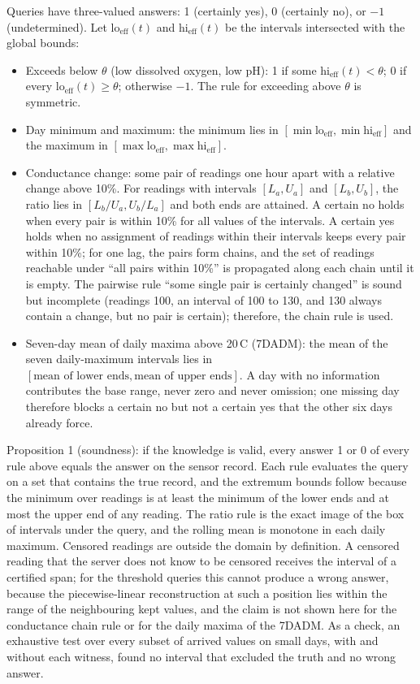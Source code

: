 Queries have three-valued answers: 1 (certainly yes), 0 (certainly no), or $-1$ (undetermined). Let lo$_\mathrm{eff}(t)$ and hi$_\mathrm{eff}(t)$ be the intervals intersected with the global bounds:
\begin{itemize}
  \item Exceeds below $\theta$ (low dissolved oxygen, low pH): 1 if some hi$_\mathrm{eff}(t) < \theta$; 0 if every lo$_\mathrm{eff}(t) \ge \theta$; otherwise $-1$. The rule for exceeding above $\theta$ is symmetric.
  \item Day minimum and maximum: the minimum lies in $[\min \mathrm{lo}_\mathrm{eff}, \min \mathrm{hi}_\mathrm{eff}]$ and the maximum in $[\max \mathrm{lo}_\mathrm{eff}, \max \mathrm{hi}_\mathrm{eff}]$.
  \item Conductance change: some pair of readings one hour apart with a relative change above 10\%. For readings with intervals $[L_a, U_a]$ and $[L_b, U_b]$, the ratio lies in $[L_b/U_a, U_b/L_a]$ and both ends are attained. A certain no holds when every pair is within 10\% for all values of the intervals. A certain yes holds when no assignment of readings within their intervals keeps every pair within 10\%; for one lag, the pairs form chains, and the set of readings reachable under ``all pairs within 10\%'' is propagated along each chain until it is empty. The pairwise rule ``some single pair is certainly changed'' is sound but incomplete (readings 100, an interval of 100 to 130, and 130 always contain a change, but no pair is certain); therefore, the chain rule is used.
  \item Seven-day mean of daily maxima above 20\,\textdegree C (7DADM): the mean of the seven daily-maximum intervals lies in $[\text{mean of lower ends}, \text{mean of upper ends}]$. A day with no information contributes the base range, never zero and never omission; one missing day therefore blocks a certain no but not a certain yes that the other six days already force.
\end{itemize}

Proposition 1 (soundness): if the knowledge is valid, every answer 1 or 0 of every rule above equals the answer on the sensor record. Each rule evaluates the query on a set that contains the true record, and the extremum bounds follow because the minimum over readings is at least the minimum of the lower ends and at most the upper end of any reading. The ratio rule is the exact image of the box of intervals under the query, and the rolling mean is monotone in each daily maximum. Censored readings are outside the domain by definition. A censored reading that the server does not know to be censored receives the interval of a certified span; for the threshold queries this cannot produce a wrong answer, because the piecewise-linear reconstruction at such a position lies within the range of the neighbouring kept values, and the claim is not shown here for the conductance chain rule or for the daily maxima of the 7DADM. As a check, an exhaustive test over every subset of arrived values on small days, with and without each witness, found no interval that excluded the truth and no wrong answer.

